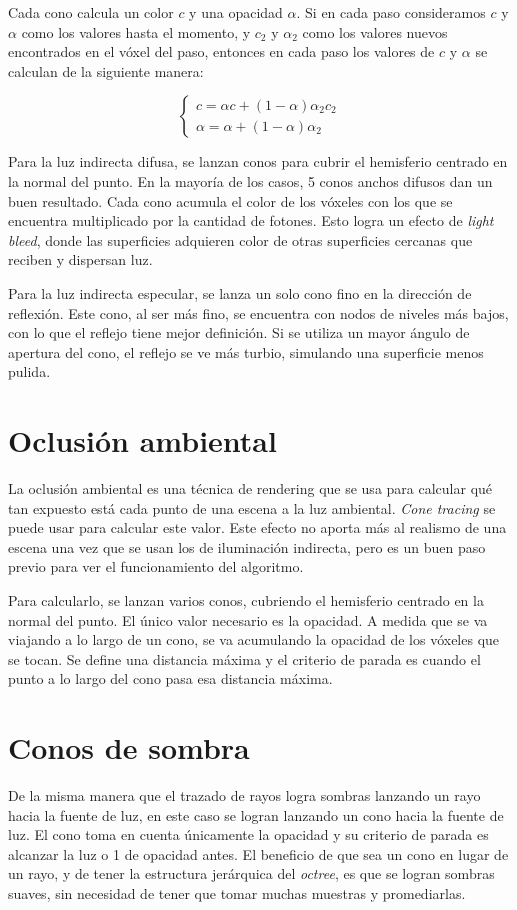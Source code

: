 Cada cono calcula un color $c$ y una opacidad $\alpha$.
Si en cada paso consideramos $c$ y $\alpha$ como los valores hasta el momento, y $c_2$ y $\alpha_2$ como los valores nuevos encontrados en el vóxel del paso, entonces en cada paso los valores de $c$ y $\alpha$ se calculan de la siguiente manera:

$$
\begin{cases}
    c = \alpha c + (1 - \alpha) \alpha_2 c_2 \\
    \alpha = \alpha + (1 - \alpha) \alpha_2
\end{cases}
$$

Para la luz indirecta difusa, se lanzan conos para cubrir el hemisferio centrado en la normal del punto.
En la mayoría de los casos, 5 conos anchos difusos dan un buen resultado.
Cada cono acumula el color de los vóxeles con los que se encuentra multiplicado por la cantidad de fotones.
Esto logra un efecto de \textit{light bleed}, donde las superficies adquieren color de otras superficies cercanas que reciben y dispersan luz.

Para la luz indirecta especular, se lanza un solo cono fino en la dirección de reflexión.
Este cono, al ser más fino, se encuentra con nodos de niveles más bajos, con lo que el reflejo tiene mejor definición.
Si se utiliza un mayor ángulo de apertura del cono, el reflejo se ve más turbio, simulando una superficie menos pulida.

\section{Oclusión ambiental}

La oclusión ambiental es una técnica de rendering que se usa para calcular qué tan expuesto está cada punto de una escena a la luz ambiental.
\textit{Cone tracing} se puede usar para calcular este valor.
Este efecto no aporta más al realismo de una escena una vez que se usan los de iluminación indirecta, pero es un buen paso previo para ver el funcionamiento del algoritmo.

Para calcularlo, se lanzan varios conos, cubriendo el hemisferio centrado en la normal del punto.
El único valor necesario es la opacidad.
A medida que se va viajando a lo largo de un cono, se va acumulando la opacidad de los vóxeles que se tocan.
Se define una distancia máxima y el criterio de parada es cuando el punto a lo largo del cono pasa esa distancia máxima.

\section{Conos de sombra}

De la misma manera que el trazado de rayos logra sombras lanzando un rayo hacia la fuente de luz, en este caso se logran lanzando un cono hacia la fuente de luz.
El cono toma en cuenta únicamente la opacidad y su criterio de parada es alcanzar la luz o 1 de opacidad antes.
El beneficio de que sea un cono en lugar de un rayo, y de tener la estructura jerárquica del \textit{octree}, es que se logran sombras suaves, sin necesidad de tener que tomar muchas muestras y promediarlas.

